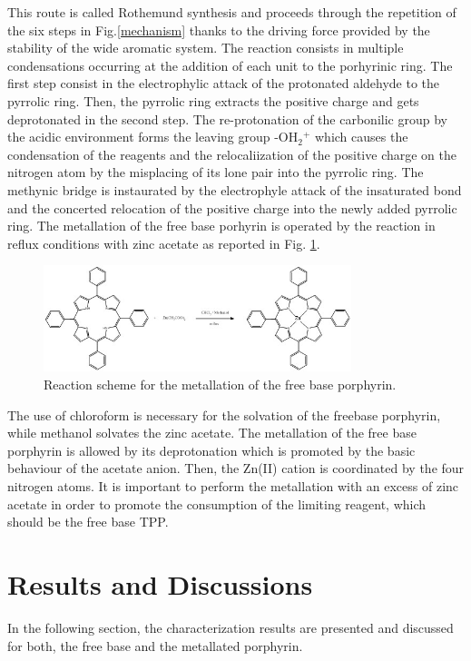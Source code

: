 \documentclass[num-refs]{wiley-article}
\begin{document}
This route is called Rothemund synthesis and proceeds through the repetition of the six steps in Fig.\ref{mechanism} thanks to the driving force provided by the stability of the wide aromatic system.
The reaction consists in multiple condensations occurring at the addition of each unit to the porhyrinic ring.
The first step consist in the electrophylic attack of the protonated aldehyde to the pyrrolic ring.
Then, the pyrrolic ring extracts the positive charge and gets deprotonated in the second step.
The re-protonation of the carbonilic group by the acidic environment forms the leaving group -OH$_{2}$$^{+}$ which causes the condensation of the reagents and the relocaliization of the positive charge on the nitrogen atom by the misplacing of its lone pair into the pyrrolic ring.
The methynic bridge is instaurated by the electrophyle attack of the insaturated bond and the concerted relocation of the positive charge into the newly added pyrrolic ring.
\break
The metallation of the free base porhyrin is operated by the reaction in reflux conditions with zinc acetate as reported in Fig. \ref{metalation}.
\begin{figure}
    \centering
    \includegraphics[width=0.8\textwidth]{Zn-TPP reaction}
    \caption{Reaction scheme for the metallation of the free base porphyrin.}
    \label{metalation}
\end{figure}
The use of chloroform is necessary for the solvation of the freebase porphyrin, while methanol solvates the zinc acetate.
The metallation of the free base porphyrin is allowed by its deprotonation which is promoted by the basic behaviour of the acetate anion.
Then, the Zn(II) cation is coordinated by the four nitrogen atoms.
It is important to perform the metallation with an excess of zinc acetate in order to promote the consumption of the limiting reagent, which should be the free base TPP.\\


\section{Results and Discussions}
In the following section, the characterization results are presented and discussed for both, the free base and the metallated porphyrin.
\end{document}
